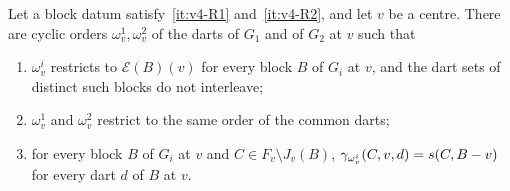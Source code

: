 \begin{lemma}\label{lem:v4-centre}
Let a block datum satisfy~\ref{it:v4-R1} and~\ref{it:v4-R2}, and let $v$ be a
centre. There are cyclic orders $\omega^1_v,\omega^2_v$ of the darts of $G_1$
and of $G_2$ at $v$ such that
\begin{enumerate}[label=(\roman*),nosep]
\item $\omega^i_v$ restricts to $\mathcal E(B)(v)$ for every block $B$ of
$G_i$ at $v$, and the dart sets of distinct such blocks do not interleave;
\item $\omega^1_v$ and $\omega^2_v$ restrict to the same order of the common
darts;
\item for every block $B$ of $G_i$ at $v$ and $C\in F_v\setminus J_v(B)$,
$\gamma_{\omega^i_v}(C,v,d)=s(C,B-v)$ for every dart $d$ of $B$ at $v$.
\end{enumerate}
\end{lemma}

